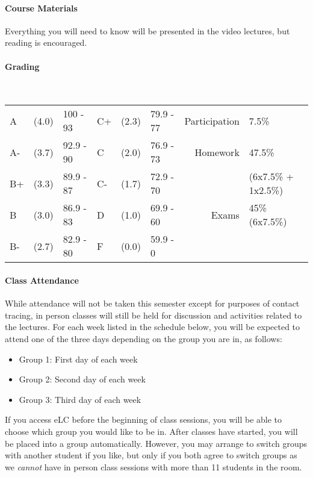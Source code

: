 \documentclass{article}
\begin{document}
  \paragraph{Course Materials}
    Everything you will need to know will be presented in the video lectures, but reading is encouraged.

  \paragraph{Grading} \mbox{}\\
    {\small
      \begin{tabular}{@{} l @{} l l l @{} l l | r l @{}}
        A   & (4.0) & 100 - 93  & C+  & (2.3) & 79.9 - 77 & Participation & 7.5\%\\
        A-  & (3.7) & 92.9 - 90 & C   & (2.0) & 76.9 - 73 & Homework      & 47.5\%\\
        B+  & (3.3) & 89.9 - 87 & C-  & (1.7) & 72.9 - 70 &               & (6x7.5\% + 1x2.5\%)\\
        B   & (3.0) & 86.9 - 83 & D   & (1.0) & 69.9 - 60 & Exams         & 45\% (6x7.5\%)\\
        B-  & (2.7) & 82.9 - 80 & F   & (0.0) & 59.9 - 0  &               &
      \end{tabular}
    }

  \paragraph{Class Attendance}
    While attendance will not be taken this semester except for purposes of contact tracing, in person classes will still be held for discussion and activities related to the lectures.
    For each week listed in the schedule below, you will be expected to attend one of the three days depending on the group you are in, as follows:
    \begin{itemize}
      \item Group 1: First day of each week
      \item Group 2: Second day of each week
      \item Group 3: Third day of each week
    \end{itemize}
    If you access eLC before the beginning of class sessions, you will be able to choose which group you would like to be in.
    After classes have started, you will be placed into a group automatically.
    However, you may arrange to switch groups with another student if you like, but only if you both agree to switch groups as we \emph{cannot} have in person class sessions with more than 11 students in the room.
\end{document}

